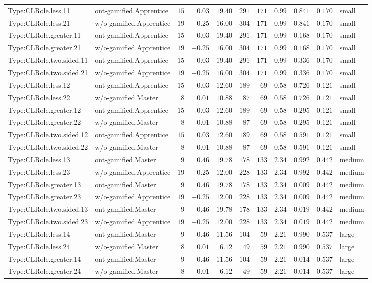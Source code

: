 \documentclass[6pt,a4paper]{article}
\begin{document}
{\begin{longtable}{llrrrrrrrrl}
Type:CLRole.less.11&ont-gamified.Apprentice&$15$&$ 0.03$&$19.40$&$291$&$171$&$ 0.99$&$0.841$&$0.170$&small\tabularnewline
Type:CLRole.less.21&w/o-gamified.Apprentice&$19$&$-0.25$&$16.00$&$304$&$171$&$ 0.99$&$0.841$&$0.170$&small\tabularnewline
Type:CLRole.greater.11&ont-gamified.Apprentice&$15$&$ 0.03$&$19.40$&$291$&$171$&$ 0.99$&$0.168$&$0.170$&small\tabularnewline
Type:CLRole.greater.21&w/o-gamified.Apprentice&$19$&$-0.25$&$16.00$&$304$&$171$&$ 0.99$&$0.168$&$0.170$&small\tabularnewline
Type:CLRole.two.sided.11&ont-gamified.Apprentice&$15$&$ 0.03$&$19.40$&$291$&$171$&$ 0.99$&$0.336$&$0.170$&small\tabularnewline
Type:CLRole.two.sided.21&w/o-gamified.Apprentice&$19$&$-0.25$&$16.00$&$304$&$171$&$ 0.99$&$0.336$&$0.170$&small\tabularnewline
Type:CLRole.less.12&ont-gamified.Apprentice&$15$&$ 0.03$&$12.60$&$189$&$ 69$&$ 0.58$&$0.726$&$0.121$&small\tabularnewline
Type:CLRole.less.22&w/o-gamified.Master&$ 8$&$ 0.01$&$10.88$&$ 87$&$ 69$&$ 0.58$&$0.726$&$0.121$&small\tabularnewline
Type:CLRole.greater.12&ont-gamified.Apprentice&$15$&$ 0.03$&$12.60$&$189$&$ 69$&$ 0.58$&$0.295$&$0.121$&small\tabularnewline
Type:CLRole.greater.22&w/o-gamified.Master&$ 8$&$ 0.01$&$10.88$&$ 87$&$ 69$&$ 0.58$&$0.295$&$0.121$&small\tabularnewline
Type:CLRole.two.sided.12&ont-gamified.Apprentice&$15$&$ 0.03$&$12.60$&$189$&$ 69$&$ 0.58$&$0.591$&$0.121$&small\tabularnewline
Type:CLRole.two.sided.22&w/o-gamified.Master&$ 8$&$ 0.01$&$10.88$&$ 87$&$ 69$&$ 0.58$&$0.591$&$0.121$&small\tabularnewline
Type:CLRole.less.13&ont-gamified.Master&$ 9$&$ 0.46$&$19.78$&$178$&$133$&$ 2.34$&$0.992$&$0.442$&medium\tabularnewline
Type:CLRole.less.23&w/o-gamified.Apprentice&$19$&$-0.25$&$12.00$&$228$&$133$&$ 2.34$&$0.992$&$0.442$&medium\tabularnewline
Type:CLRole.greater.13&ont-gamified.Master&$ 9$&$ 0.46$&$19.78$&$178$&$133$&$ 2.34$&$0.009$&$0.442$&medium\tabularnewline
Type:CLRole.greater.23&w/o-gamified.Apprentice&$19$&$-0.25$&$12.00$&$228$&$133$&$ 2.34$&$0.009$&$0.442$&medium\tabularnewline
Type:CLRole.two.sided.13&ont-gamified.Master&$ 9$&$ 0.46$&$19.78$&$178$&$133$&$ 2.34$&$0.019$&$0.442$&medium\tabularnewline
Type:CLRole.two.sided.23&w/o-gamified.Apprentice&$19$&$-0.25$&$12.00$&$228$&$133$&$ 2.34$&$0.019$&$0.442$&medium\tabularnewline
Type:CLRole.less.14&ont-gamified.Master&$ 9$&$ 0.46$&$11.56$&$104$&$ 59$&$ 2.21$&$0.990$&$0.537$&large\tabularnewline
Type:CLRole.less.24&w/o-gamified.Master&$ 8$&$ 0.01$&$ 6.12$&$ 49$&$ 59$&$ 2.21$&$0.990$&$0.537$&large\tabularnewline
Type:CLRole.greater.14&ont-gamified.Master&$ 9$&$ 0.46$&$11.56$&$104$&$ 59$&$ 2.21$&$0.014$&$0.537$&large\tabularnewline
Type:CLRole.greater.24&w/o-gamified.Master&$ 8$&$ 0.01$&$ 6.12$&$ 49$&$ 59$&$ 2.21$&$0.014$&$0.537$&large\tabularnewline

\end{longtable}}
\end{document}
